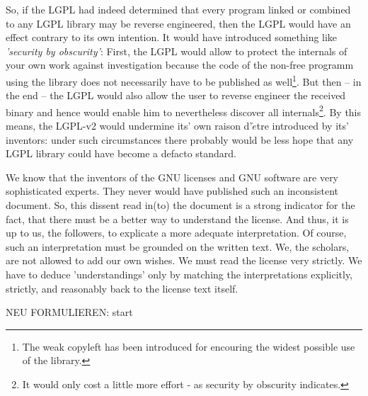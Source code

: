 So, if the LGPL had indeed determined that every program linked or combined to
any LGPL library may be reverse engineered, then the LGPL would have an effect
contrary to its own intention. It would have introduced something like
\emph{'security by obscurity'}: First, the LGPL would allow to protect the
internals of your own work against investigation because the code of the
non-free programm using the library does not necessarily have to be published as
well\footnote{The weak copyleft has been introduced for encouring the widest
possible use of the library.}. But then -- in the end -- the LGPL would also
allow the user to reverse engineer the received binary and hence would enable
him to nevertheless discover all internals\footnote{It would only cost a little
more effort - as security by obscurity indicates.}. By this means, the LGPL-v2
would undermine its' own raison d'$\grave{e}$tre introduced by its' inventors:
under such circumstances there probably would be less hope that any LGPL library
could have become a defacto standard.

We know that the inventors of the GNU licenses and GNU software are very
sophisticated experts. They never would have published such an inconsistent
document. So, this dissent read in(to) the document is a strong indicator for
the fact, that there must be a better way to understand the license. And thus,
it is up to us, the followers, to explicate a more adequate interpretation. Of
course, such an interpretation must be grounded on the written text. We, the
scholars, are not allowed to add our own wishes. We must read the license very
strictly. We have to deduce 'understandings' only by matching the
interpretations explicitly, strictly, and reasonably back to the license text
itself.


NEU FORMULIEREN: start


